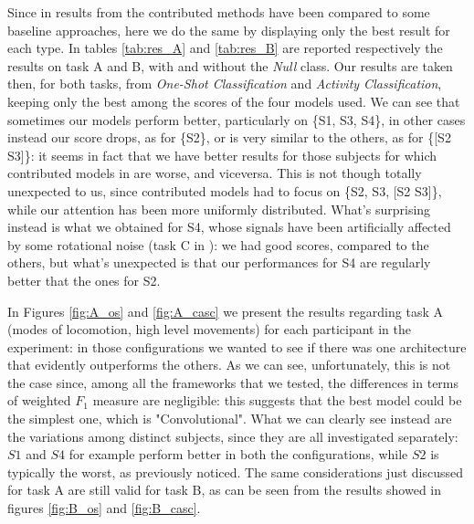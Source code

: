 Since in \cite{Chavarriaga2013} results from the contributed methods have been compared to some baseline approaches, here we do the same by displaying only the best result for each type. In tables \ref{tab:res_A} and \ref{tab:res_B}
are reported respectively the results on task A and B, with and without the \textit{Null} class. Our results are taken then, for both tasks, from \textit{One-Shot Classification} and \textit{Activity Classification}, keeping only the best among the scores of the four models used.
We can see that sometimes our models perform better, particularly on \{S1, S3, S4\}, in other cases instead our score drops, as for \{S2\}, or is very similar to the others, as for \{[S2 S3]\}: it seems in fact that we have better results for those subjects for which contributed models in \cite{Chavarriaga2013} are worse, and viceversa. This is not though totally unexpected to us, since contributed models had to focus on \{S2, S3, [S2 S3]\}, while our attention has been more uniformly distributed.
What's surprising instead is what we obtained for S4, whose signals have been artificially affected by some rotational noise (task C in \cite{Chavarriaga2013}): we had good scores, compared to the others, but what's unexpected is that our performances for S4 are regularly better that the ones for S2.

In Figures \ref{fig:A_os} and \ref{fig:A_casc} we present the results regarding task A (modes of locomotion, high level movements) for each participant in the experiment: in those configurations we wanted to see if there was one architecture that evidently outperforms the others. As we can see, unfortunately, this is not the case since, among all the frameworks that we tested, the differences in terms of weighted $F_1$ measure are negligible: this suggests that the best model could be the simplest one, which is "Convolutional".
What we can clearly see instead are the variations among distinct subjects, since they are all investigated separately: $S1$ and $S4$ for example perform better in both the configurations, while $S2$ is typically the worst, as previously noticed.
The same considerations just discussed for task A are still valid for task B, as can be seen from the results showed in figures \ref{fig:B_os} and \ref{fig:B_casc}.


